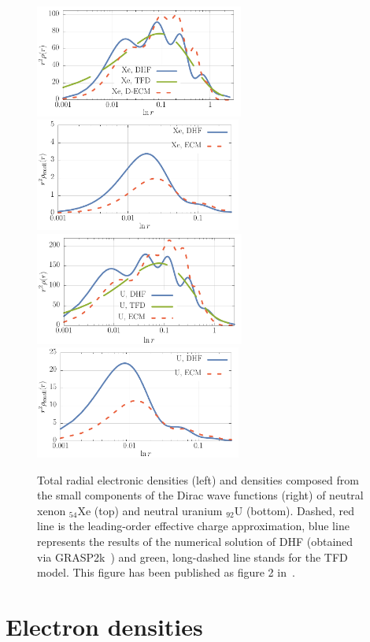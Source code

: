 \begin{figure}
  \centering  
  \includegraphics[height=37mm]{Graphs/xe_rel_rho.pdf}
 \includegraphics[height=37mm]{Graphs/xe_rel_rho_small.pdf}
  \includegraphics[height=37mm]{Graphs/u_rel_rho.pdf}
  \includegraphics[height=37mm]{Graphs/u_rel_rho_small.pdf}
  \caption{Total radial electronic densities (left)
    and densities composed from the small components of the
    Dirac wave functions (right) of neutral
    xenon $_{54}$Xe (top) and neutral uranium
    $_{92}$U (bottom). Dashed, red line is the
    leading-order effective charge approximation, blue line
     represents the results of the numerical
    solution of DHF (obtained via GRASP2k~\cite{jonsson_new_2013,
      DYALL1989425}) and  green, long-dashed line stands for the TFD model. This figure has been published as figure 2 in~\cite{Dzikowski_2021}.}
  \label{Rel_rhoPlot}
\end{figure}

\section{Electron densities}

